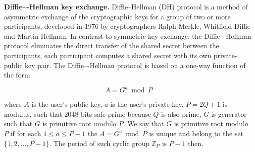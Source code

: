 \textbf{Diffie–-Hellman key exchange.} Diffie--Hellman (DH) protocol is a method of asymmetric exchange
of the cryptographic keys for a group of two or more participants,
developed in 1976 by cryptographers Ralph Merkle, Whitfield Diffie and Martin Hellman.
In contrast to symmetric key exchange, the Diffie–-Hellman protocol eliminates the direct transfer of the shared secret
between the participants, each participant computes a shared secret with its own private-public key pair.
The Diffie–-Hellman protocol is based on a one-way function of the form

\begin{equation}
    A = G ^ a \bmod P \label{eq:equation}
\end{equation}

where $A$ is the user's public key,
$a$ is the user's private key,
$P=2Q+1$ is modulus, such that 2048 bits safe-prime because $Q$ is also prime,
$G$ is generator such that $G$ is primitive root modulo $P$.
We say that $G$ is primitive root modulo $P$ if for each $1 \leq a \leq P - 1$ the $A = G ^ a \bmod P$
is unique and belong to the set $\{1, 2, \dots, P-1\}$.
The period of such cyclic group $\mathbb{Z}_{P}$ is $P-1$ then.

